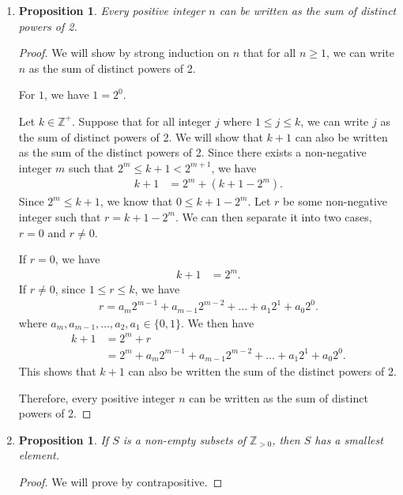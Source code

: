 \documentclass{article}
\newtheorem{prop}[thm]{Proposition}
\begin{document}
\begin{enumerate}
\begin{proof}
    Therefore, for all $n \in \mathbb{Z}_{\geq 0}$, we have $7|2^{n+2} + 3^{2n+1}$.
\end{proof}

\item 
\begin{prop}
    Every positive integer $n$ can be written as the sum of distinct powers of 2.
\end{prop}
\begin{proof}
    We will show by strong induction on $n$ that for all $n \geq 1$, we can write $n$ as the sum of distinct powers of 2.
    
    For $1$, we have $1 = 2^0$. 
    
    Let $k \in \mathbb{Z}^+$. Suppose that for all integer $j$ where $1 \leq j \leq k$, we can write $j$ as the sum of distinct powers of 2. We will show that $k + 1$ can also be written as the sum of the distinct powers of 2. Since there exists a non-negative integer $m$ such that $2^m \leq k + 1 < 2^{m+1}$, we have 
    \begin{align}
        k + 1 &= 2^m + (k + 1 - 2^m).
    \end{align}
    Since $2^m \leq k + 1$, we know that $0 \leq k + 1 - 2^m$. Let $r$ be some non-negative integer such that $r = k + 1 - 2^m$. We can then separate it into two cases, $r = 0$ and $r \neq 0$. 

    If $r = 0$, we have
    \begin{align}
        k + 1 &= 2^m.
    \end{align}
    If $r \neq 0$, since $1 \leq r \leq k$, we have
    \begin{gather}
        r = a_{m}2^{m - 1} + a_{m-1}2^{m - 2} + \ldots + a_{1}2^1 + a_{0}2^0.
    \end{gather}
    where $a_{m}, a_{m-1}, \ldots ,a_2, a_1 \in \{0, 1\}$. We then have
    \begin{align}
        k + 1 &= 2^m + r \\
              &= 2^m + a_{m}2^{m - 1} + a_{m-1}2^{m - 2} + \ldots + a_{1}2^1 + a_{0}2^0.
    \end{align}
    This shows that $k + 1$ can also be written the sum of the distinct powers of 2. 
    
    Therefore, every positive integer $n$ can be written as the sum of distinct powers of 2.
\end{proof}

\item 
\begin{prop}
   If $S$ is a non-empty subsets of $\mathbb{Z}_{> 0}$, then $S$ has a smallest element.
\end{prop}
\begin{proof}
    We will prove by contrapositive.


\end{proof}
\end{enumerate}
\end{document}
